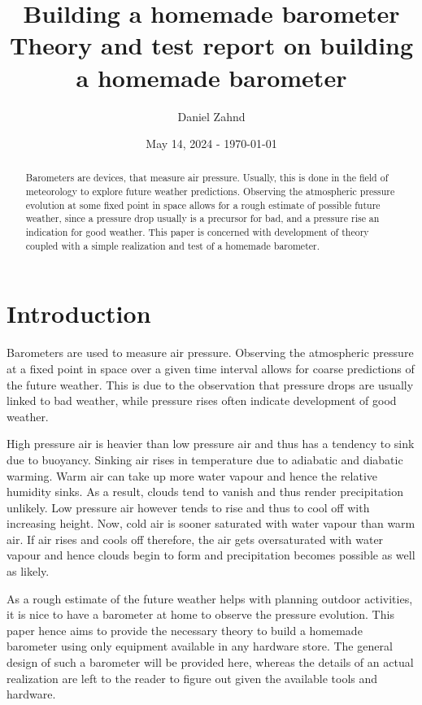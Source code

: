 \documentclass[a4paper,10pt, twocolumn]{article}
\author{Daniel Zahnd}
\date{May 14, 2024 - \today}
\title{Building a homemade barometer \\ \vspace{0.5cm} \normalsize Theory and test report on building a homemade barometer}
\begin{document}
\maketitle


\begin{abstract}
Barometers are devices, that measure air pressure. Usually, this is done in the field of meteorology to explore future weather predictions. Observing the atmospheric pressure evolution at some fixed point in space allows for a rough estimate of possible future weather, since a pressure drop usually is a precursor for bad, and a pressure rise an indication for good weather. This paper is concerned with development of theory coupled with a simple realization and test of a homemade barometer.
\end{abstract}

\section{Introduction}
Barometers are used to measure air pressure. Observing the atmospheric pressure at a fixed point in space over a given time interval allows for coarse predictions of the future weather. This is due to the observation that pressure drops are usually linked to bad weather, while pressure rises often indicate development of good weather. 

High pressure air is heavier than low pressure air and thus has a tendency to sink due to buoyancy. Sinking air rises in temperature due to adiabatic and diabatic warming. Warm air can take up more water vapour and hence the relative humidity sinks. As a result, clouds tend to vanish and thus render precipitation unlikely. Low pressure air however tends to rise and thus to cool off with increasing height. Now, cold air is sooner saturated with water vapour than warm air. If air rises and cools off therefore, the air gets oversaturated with water vapour and hence clouds begin to form and precipitation becomes possible as well as likely.

As a rough estimate of the future weather helps with planning outdoor activities, it is nice to have a barometer at home to observe the pressure evolution. This paper hence aims to provide the necessary theory to build a homemade barometer using only equipment available in any hardware store. The general design of such a barometer will be provided here, whereas the details of an actual realization are left to the reader to figure out given the available tools and hardware.
\end{document}
